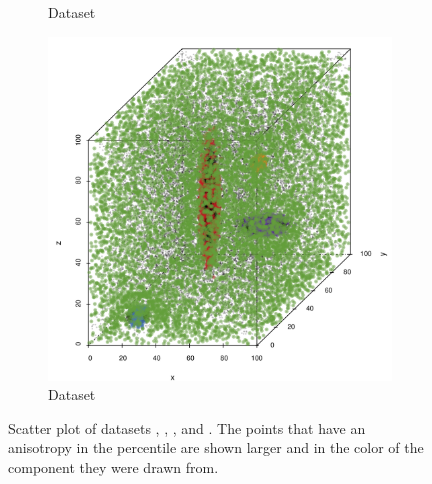 \begin{figure}
\begin{subfigure}{0.23\textwidth}
			\caption{Dataset \ferdosiThree}
			\label{fig:discussion:anisotropy:ferdosi3}
		\end{subfigure}		
		\begin{subfigure}{0.23\textwidth}
			\centering
			\includegraphics[keepaspectratio=true, width=\textwidth, height=0.23\textheight]{discussion/img/baakman_3_60000_anisotropy.png}
			\caption{Dataset \baakmanThree}
			\label{fig:discussion:anisotropy:baakman3}
		\end{subfigure}			
		\caption{Scatter plot of datasets
			 \ferdosiTwo, %
			 \baakmanTwo, %
			 \ferdosiThree, and %
			 \baakmanThree. %
			The points that have an anisotropy in the  percentile are shown larger and in the color of the component they were drawn from.}
		\label{fig:discussion:anisotropy:multisphere}
	\end{figure}	